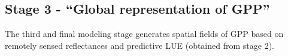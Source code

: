 \subsection{Stage 3 - ``Global representation of GPP''}
\label{sec:ovstage3}
The third and final modeling stage generates spatial fields of GPP based on remotely sensed reflectances and predictive LUE (obtained from stage 2).
